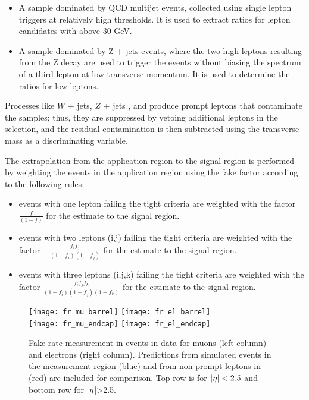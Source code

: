 \begin{itemize}
\item A sample dominated by QCD multijet events, collected using single lepton triggers at relatively high \pt thresholds. It is used to extract ratios for lepton candidates with \pt above 30 GeV.
\item A sample dominated by Z + jets events, where the two high-\pt leptons resulting from the Z decay are used to trigger the events without biasing the \pt spectrum of a third lepton at low transverse momentum. It is used to determine the ratios for low-\pt leptons. 
\end{itemize}

Processes like $W$ + jets, $Z$ + jets , \WZ and \ZZ produce prompt leptons that contaminate the samples; thus, they are suppressed by vetoing additional leptons in the selection, and the residual contamination is then subtracted using the transverse mass as a discriminating variable.

The extrapolation from the application region to the signal region is performed by weighting the events in the application region using the fake factor according to the following rules:

\begin{itemize}
\item events with one lepton failing the tight criteria are weighted with the factor $\frac{f}{(1-f)}$ for the estimate to the signal region. 
\item events with two leptons (i,j) failing the tight criteria are weighted with the factor $-\frac{f_if_j}{(1-f_i)(1-f_j)}$ for the estimate to the signal region. 
\item events with three leptons (i,j,k) failing the tight criteria are weighted with the factor $\frac{f_if_jf_k}{(1-f_i)(1-f_j)(1-f_k)}$ for the estimate to the signal region. 
\end{itemize}

\begin{figure}[htb]
\centering
        \texttt{[image: fr\_mu\_barrel]}
        \texttt{[image: fr\_el\_barrel]} \\
        \texttt{[image: fr\_mu\_endcap]}
        \texttt{[image: fr\_el\_endcap]}
\caption[Fake rates]{Fake rate measurement in events in data for muons (left column) and electrons (right column). Predictions from simulated events in the measurement region (blue) and from non-prompt leptons in \ttbar (red) are included for comparison. Top row is for ${|\eta|<2.5}$ and bottom row for |$\eta$|>2.5.}
\label{fig:frmeas-comb-data}
\end{figure}

